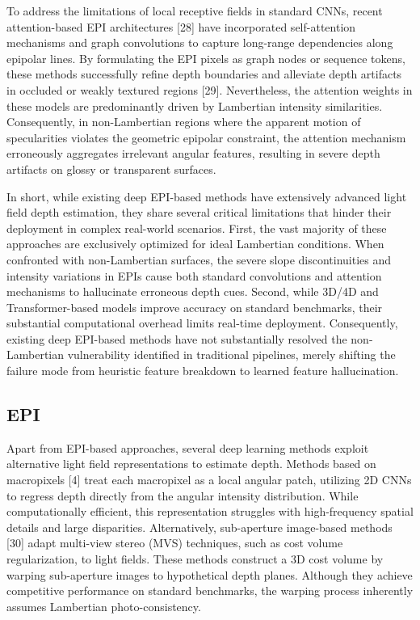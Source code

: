 To address the limitations of local receptive fields in standard CNNs, recent attention-based EPI architectures [28] have incorporated self-attention mechanisms and graph convolutions to capture long-range dependencies along epipolar lines. By formulating the EPI pixels as graph nodes or sequence tokens, these methods successfully refine depth boundaries and alleviate depth artifacts in occluded or weakly textured regions [29]. Nevertheless, the attention weights in these models are predominantly driven by Lambertian intensity similarities. Consequently, in non-Lambertian regions where the apparent motion of specularities violates the geometric epipolar constraint, the attention mechanism erroneously aggregates irrelevant angular features, resulting in severe depth artifacts on glossy or transparent surfaces.

In short, while existing deep EPI-based methods have extensively advanced light field depth estimation, they share several critical limitations that hinder their deployment in complex real-world scenarios. First, the vast majority of these approaches are exclusively optimized for ideal Lambertian conditions. When confronted with non-Lambertian surfaces, the severe slope discontinuities and intensity variations in EPIs cause both standard convolutions and attention mechanisms to hallucinate erroneous depth cues. Second, while 3D/4D and Transformer-based models improve accuracy on standard benchmarks, their substantial computational overhead limits real-time deployment. Consequently, existing deep EPI-based methods have not substantially resolved the non-Lambertian vulnerability identified in traditional pipelines, merely shifting the failure mode from heuristic feature breakdown to learned feature hallucination.

\subsection{EPI}

Apart from EPI-based approaches, several deep learning methods exploit alternative light field representations to estimate depth. Methods based on macropixels [4] treat each macropixel as a local angular patch, utilizing 2D CNNs to regress depth directly from the angular intensity distribution. While computationally efficient, this representation struggles with high-frequency spatial details and large disparities. Alternatively, sub-aperture image-based methods [30] adapt multi-view stereo (MVS) techniques, such as cost volume regularization, to light fields. These methods construct a 3D cost volume by warping sub-aperture images to hypothetical depth planes. Although they achieve competitive performance on standard benchmarks, the warping process inherently assumes Lambertian photo-consistency. 

